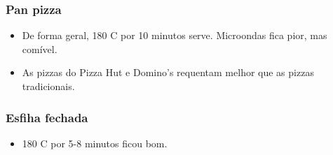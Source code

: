 \subsubsection*{Pan pizza}
\begin{itemize}
	\item De forma geral, 180 \grau C por 10 minutos serve. Microondas fica pior, mas comível.
	\item As pizzas do Pizza Hut e Domino's requentam melhor que as pizzas tradicionais.
\end{itemize}

\subsubsection*{Esfiha fechada}
\begin{itemize}
	\item 180 \grau C por 5-8 minutos ficou bom.
\end{itemize}

